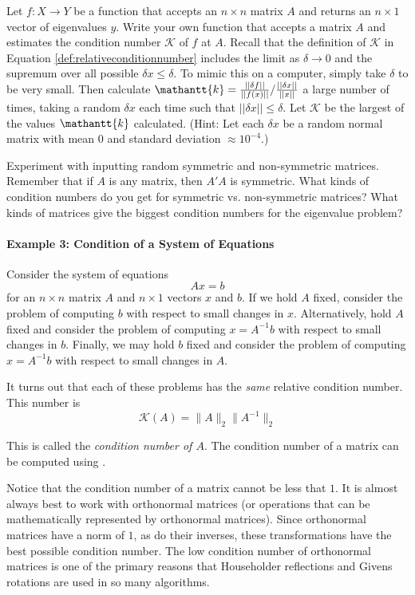 \begin{problem}
Let $f:X\rightarrow Y$ be a function that accepts an $n\times n$ matrix $A$ and returns an $n \times 1$ vector of eigenvalues $y$. Write your own function that accepts a matrix $A$ and estimates the condition number $\mathcal{K}$ of $f$ at $A$. Recall that the definition of $\mathcal{K}$ in Equation \ref{def:relativeconditionnumber} includes the limit as $\delta \rightarrow 0$ and the supremum over all possible $\delta x \leq \delta$. To mimic this on a computer, simply take $\delta$ to be very small. Then calculate $\mathantt{k} =  { \frac{|| \delta f||}{||f(x)||} } / { \frac{|| \delta x||}{||x||} } $ a large number of times, taking a random $\delta x$ each time such that $||\delta x|| \leq \delta$. Let $\mathcal{K}$ be the largest of the values $\mathantt{k}$ calculated. (Hint: Let each $\delta x$ be a random normal matrix with mean $0$ and standard deviation $\approx 10^{-4}$.)

Experiment with inputting random symmetric and non-symmetric matrices. Remember that if $A$ is any matrix, then $A'A$ is symmetric. What kinds of condition numbers do you get for symmetric vs. non-symmetric matrices? What kinds of matrices give the biggest condition numbers for the eigenvalue problem?
\end{problem}

\paragraph{Example 3: Condition of a System of Equations}
Consider the system of equations
\[ Ax = b
\] for an $n \times n$ matrix $A$ and $n \times 1$ vectors $x$ and $b$. If we hold $A$ fixed, consider the problem of computing $b$ with respect to small changes in $x$. Alternatively, hold $A$ fixed and consider the problem of computing $x = A^{-1} b$ with respect to small changes in $b$. Finally, we may hold $b$ fixed and consider the problem of computing $x = A^{-1}b$ with respect to small changes in $A$.

It turns out that each of these problems has the \emph{same} relative condition number. This number is 
\[
\mathcal{K} (A) = \|A\|_2 \|A^{-1}\|_2
\]

This is called the \emph{condition number of $A$}.
The condition number of a matrix can be computed using .

Notice that the condition number of a matrix cannot be less that $1$.
It is almost always best to work with orthonormal matrices (or operations that can be mathematically represented by orthonormal matrices).
Since orthonormal matrices have a norm of $1$, as do their inverses, these transformations have the best possible condition number.
The low condition number of orthonormal matrices is one of the primary reasons that Householder reflections and Givens rotations are used in so many algorithms.

